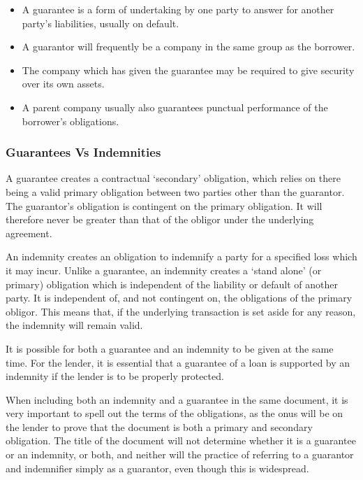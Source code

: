 \documentclass[
]{article}
\newenvironment{Shaded}{}{}
\newcommand{\NormalTok}[1]{#1}
\providecommand{\tightlist}{%
  \setlength{\itemsep}{0pt}\setlength{\parskip}{0pt}}
\begin{document}
\begin{itemize}
\tightlist
\item
  A guarantee is a form of undertaking by one party to answer for
  another party's liabilities, usually on default.
\item
  A guarantor will frequently be a company in the same group as the
  borrower.
\item
  The company which has given the guarantee may be required to give
  security over its own assets.
\item
  A parent company usually also guarantees punctual performance of the
  borrower's obligations.
\end{itemize}

\hypertarget{guarantees-vs-indemnities}{%
\subsubsection{Guarantees Vs
Indemnities}\label{guarantees-vs-indemnities}}

A guarantee creates a contractual `secondary' obligation, which relies
on there being a valid primary obligation between two parties other than
the guarantor. The guarantor's obligation is contingent on the primary
obligation. It will therefore never be greater than that of the obligor
under the underlying agreement.

An indemnity creates an obligation to indemnify a party for a specified
loss which it may incur. Unlike a guarantee, an indemnity creates a
`stand alone' (or primary) obligation which is independent of the
liability or default of another party. It is independent of, and not
contingent on, the obligations of the primary obligor. This means that,
if the underlying transaction is set aside for any reason, the indemnity
will remain valid.

It is possible for both a guarantee and an indemnity to be given at the
same time. For the lender, it is essential that a guarantee of a loan is
supported by an indemnity if the lender is to be properly protected.

\begin{Shaded}
\begin{Highlighting}[]
\NormalTok{When including both an indemnity and a guarantee in the same document, it is very important to spell out the terms of the obligations, as the onus will be on the lender to prove that the document is both a primary and secondary obligation. The title of the document will not determine whether it is a guarantee or an indemnity, or both, and neither will the practice of referring to a guarantor and indemnifier simply as a guarantor, even though this is widespread.}
\end{Highlighting}
\end{Shaded}
\end{document}
